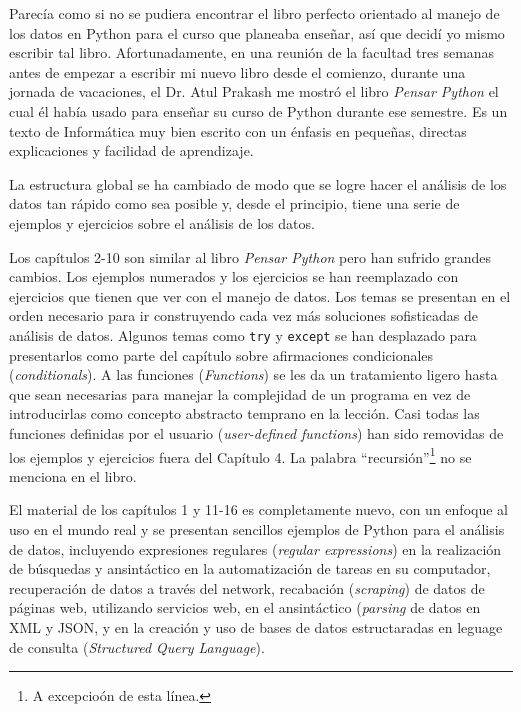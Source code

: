Parec\'ia como si no se pudiera encontrar el libro perfecto orientado al manejo de los datos en Python para el curso que planeaba ense\~nar, as\'i que decid\'i yo mismo escribir tal libro. 
Afortunadamente, en una reuni\'on de la facultad tres semanas antes de empezar a escribir mi nuevo libro desde el comienzo, durante una jornada de vacaciones, el Dr. Atul Prakash me mostr\'o el libro \emph{Pensar Python} el cual \'el hab\'ia usado para ense\~nar su curso de Python durante ese semestre.  
Es un texto de Inform\'atica muy bien escrito con un \'enfasis en peque\~nas, directas explicaciones y facilidad de aprendizaje.  

La estructura global se ha cambiado de modo que se logre hacer el an\'alisis de los datos tan r\'apido como sea posible y, desde el principio, tiene una serie de ejemplos y ejercicios sobre el an\'alisis de los datos.

Los cap\'itulos 2-10 son similar al libro \emph{Pensar Python}
pero han sufrido grandes cambios. Los ejemplos numerados y los ejercicios se han reemplazado con ejercicios que tienen que ver con el manejo de datos. 
Los temas se presentan en el orden necesario para ir construyendo cada vez m\'as soluciones sofisticadas de an\'alisis de datos. Algunos temas como {\tt try} y
{\tt except} se han desplazado para presentarlos como parte del cap\'itulo sobre afirmaciones condicionales (\textit{conditionals}).  A las funciones (\textit{Functions}) se les da un tratamiento ligero hasta que sean necesarias para manejar la complejidad de un programa en vez de introducirlas como concepto abstracto temprano en la lecci\'on. Casi todas las funciones definidas por el usuario (\textit{user-defined functions}) han sido removidas de los ejemplos y ejercicios fuera del Cap\'itulo 4.
La palabra ``recursi\'on''\footnote{A excepcio\'on de esta l\'inea.}
no se menciona en el libro.

El material de los cap\'itulos 1 y 11-16 es completamente nuevo, con un enfoque al uso en el mundo real y se presentan sencillos ejemplos de Python para el an\'alisis de datos, incluyendo expresiones regulares (\textit{regular expressions}) en la realizaci\'on de b\'usquedas y an\alisis sint\'actico en la automatizaci\'on de tareas en su computador, recuperaci\'on de datos a trav\'es del network, recabaci\'on (\textit{scraping}) de datos de p\'aginas web, utilizando servicios web, en el an\alisis sint\'actico (\textit{parsing} de datos en XML y JSON, y en la creaci\'on y uso de bases de datos estructaradas en leguage de consulta (\textit{Structured Query Language}).

